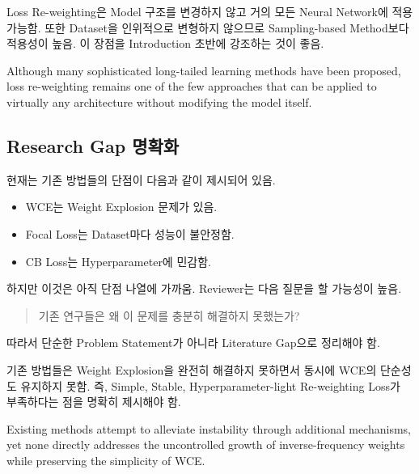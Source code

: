 \documentclass[11pt,a4paper]{article}
\begin{document}
\begin{tcolorbox}[title=개선 방향]
Loss Re-weighting은 Model 구조를 변경하지 않고 거의 모든 Neural Network에 적용 가능함. 또한 Dataset을 인위적으로 변형하지 않으므로 Sampling-based Method보다 적용성이 높음. 이 장점을 Introduction 초반에 강조하는 것이 좋음.
\end{tcolorbox}

\begin{tcolorbox}[title=추가 가능 문장 예시]
Although many sophisticated long-tailed learning methods have been proposed, loss re-weighting remains one of the few approaches that can be applied to virtually any architecture without modifying the model itself.
\end{tcolorbox}

\subsection{Research Gap 명확화}

현재는 기존 방법들의 단점이 다음과 같이 제시되어 있음.

\begin{itemize}
\item WCE는 Weight Explosion 문제가 있음.
\item Focal Loss는 Dataset마다 성능이 불안정함.
\item CB Loss는 Hyperparameter에 민감함.
\end{itemize}

하지만 이것은 아직 단점 나열에 가까움. Reviewer는 다음 질문을 할 가능성이 높음.

\begin{quote}
기존 연구들은 왜 이 문제를 충분히 해결하지 못했는가?
\end{quote}

따라서 단순한 Problem Statement가 아니라 Literature Gap으로 정리해야 함.

\begin{tcolorbox}[title=개선 방향]
기존 방법들은 Weight Explosion을 완전히 해결하지 못하면서 동시에 WCE의 단순성도 유지하지 못함. 즉, Simple, Stable, Hyperparameter-light Re-weighting Loss가 부족하다는 점을 명확히 제시해야 함.
\end{tcolorbox}

\begin{tcolorbox}[title=추가 가능 문장 예시]
Existing methods attempt to alleviate instability through additional mechanisms, yet none directly addresses the uncontrolled growth of inverse-frequency weights while preserving the simplicity of WCE.
\end{tcolorbox}
\end{document}
